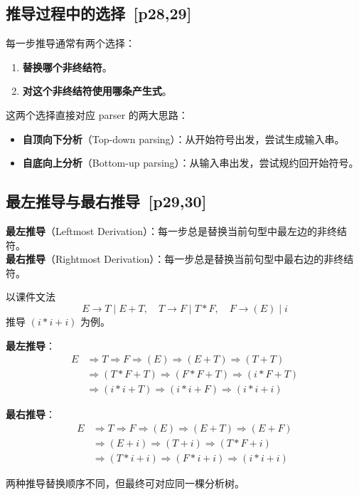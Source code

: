 \documentclass[UTF8,fontset=none,11pt]{ctexart}
\newenvironment{defbox}[1][]{%
  \par\medskip\noindent{\color{defrule}\rule{\linewidth}{1.1pt}}\par\nopagebreak
  \noindent{\bfseries\color{defrule}#1}\par\nopagebreak\smallskip}%
  {\par\nopagebreak\smallskip\noindent{\color{defrule}\rule{\linewidth}{0.4pt}}\par\medskip}
\newcommand{\pg}[1]{\texorpdfstring{{\small\color{graytext}\,[p#1]}}{ [p#1]}}
\newcommand{\term}[2]{\textbf{#1}（#2）}
\begin{document}
\subsection{推导过程中的选择 \pg{28,29}}
每一步推导通常有两个选择：
\begin{enumerate}
  \item \textbf{替换哪个非终结符}。
  \item \textbf{对这个非终结符使用哪条产生式}。
\end{enumerate}

这两个选择直接对应 parser 的两大思路：
\begin{itemize}
  \item \term{自顶向下分析}{Top-down parsing}：从开始符号出发，尝试生成输入串。
  \item \term{自底向上分析}{Bottom-up parsing}：从输入串出发，尝试规约回开始符号。
\end{itemize}

\subsection{最左推导与最右推导 \pg{29,30}}
\begin{defbox}[最左推导与最右推导]
\term{最左推导}{Leftmost Derivation}：每一步总是替换当前句型中最左边的非终结符。\\
\term{最右推导}{Rightmost Derivation}：每一步总是替换当前句型中最右边的非终结符。
\end{defbox}

以课件文法
\[
E\to T\mid E+T,\quad T\to F\mid T*F,\quad F\to (E)\mid i
\]
推导 \((i*i+i)\) 为例。

\textbf{最左推导}：
\[
\begin{aligned}
E&\Rightarrow T\Rightarrow F\Rightarrow (E)\Rightarrow(E+T)\Rightarrow(T+T)\\
&\Rightarrow(T*F+T)\Rightarrow(F*F+T)\Rightarrow(i*F+T)\\
&\Rightarrow(i*i+T)\Rightarrow(i*i+F)\Rightarrow(i*i+i)
\end{aligned}
\]

\textbf{最右推导}：
\[
\begin{aligned}
E&\Rightarrow T\Rightarrow F\Rightarrow (E)\Rightarrow(E+T)\Rightarrow(E+F)\\
&\Rightarrow(E+i)\Rightarrow(T+i)\Rightarrow(T*F+i)\\
&\Rightarrow(T*i+i)\Rightarrow(F*i+i)\Rightarrow(i*i+i)
\end{aligned}
\]

两种推导替换顺序不同，但最终可对应同一棵分析树。
\end{document}

